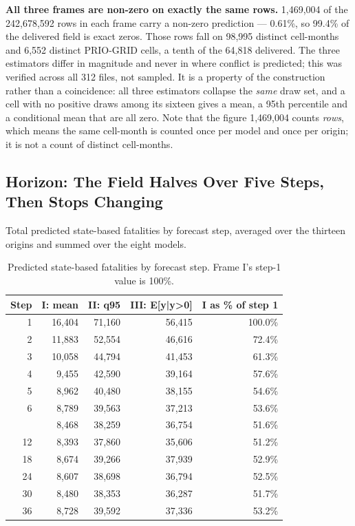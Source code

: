 \textbf{All three frames are non-zero on exactly the same rows.} 1,469,004 of the 242,678,592 rows
in each frame carry a non-zero prediction --- 0.61\%, so 99.4\% of the delivered field is exact
zeros. Those rows fall on 98,995 distinct cell-months and 6,552 distinct PRIO-GRID cells, a tenth
of the 64,818 delivered. The three estimators differ in magnitude and never in where conflict is
predicted; this was verified across all 312 files, not sampled. It is a property of the
construction rather than a coincidence: all three estimators collapse the \emph{same} draw set, and
a cell with no positive draws among its sixteen gives a mean, a 95th percentile and a conditional
mean that are all zero. Note that the figure 1,469,004 counts \emph{rows}, which means the same
cell-month is counted once per model and once per origin; it is not a count of distinct
cell-months.

\subsection*{Horizon: The Field Halves Over Five Steps, Then Stops Changing}

Total predicted state-based fatalities by forecast step, averaged over the thirteen origins and
summed over the eight models.

\begin{table}[h!]
\centering
\small
\renewcommand{\arraystretch}{1.2}
\caption{Predicted state-based fatalities by forecast step. Frame I's step-1 value is 100\%.}
\label{tab:horizon}
\begin{tabular}{@{}rrrrr@{}}
\toprule
\textbf{Step} & \textbf{I: mean} & \textbf{II: q95} & \textbf{III: E[y|y>0]}
 & \textbf{I as \% of step 1} \\ \midrule
 1 & 16,404 & 71,160 & 56,415 & 100.0\% \\
 2 & 11,883 & 52,554 & 46,616 &  72.4\% \\
 3 & 10,058 & 44,794 & 41,453 &  61.3\% \\
 4 &  9,455 & 42,590 & 39,164 &  57.6\% \\
 5 &  8,962 & 40,480 & 38,155 &  54.6\% \\
 6 &  8,789 & 39,563 & 37,213 &  53.6\% \\ \addlinespace
 9 &  8,468 & 38,259 & 36,754 &  51.6\% \\
12 &  8,393 & 37,860 & 35,606 &  51.2\% \\
18 &  8,674 & 39,266 & 37,939 &  52.9\% \\
24 &  8,607 & 38,698 & 36,794 &  52.5\% \\
30 &  8,480 & 38,353 & 36,287 &  51.7\% \\
36 &  8,728 & 39,592 & 37,336 &  53.2\% \\
\bottomrule
\end{tabular}
\end{table}

